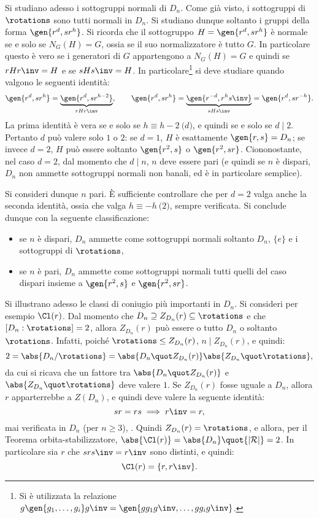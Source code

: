 \documentclass[12pt]{scrartcl}
\begin{document}
	
	
	Si studiano adesso i sottogruppi normali di $D_n$. Come già visto, i sottogruppi di
	$\rotations$ sono tutti normali in $D_n$. Si studiano dunque soltanto i gruppi
	della forma $\gen{r^d, s r^h}$. Si ricorda che il sottogruppo
	$H = \gen{r^d, s r^h}$ è normale se e solo se $N_G(H) = G$, ossia se il suo
	normalizzatore è tutto $G$. In particolare questo è vero se i generatori di $G$
	appartengono a $N_G(H) = G$ e quindi se $r H r\inv = H$ e se $s H s\inv = H$.
	In particolare\footnote{
		Si è utilizzata la relazione $g \gen{g_1, \ldots, g_i} g\inv = \gen{g g_1 g\inv, \ldots, g g_i g\inv}$.
	} si deve studiare quando valgono le seguenti identità:
	\[
		\gen{r^d, s r^h} = \underbrace{\gen{r^d, s r^{h-2}}}_{r H r\inv},
		\qquad \gen{r^d, s r^h} = \underbrace{\gen{r^{-d}, r^h s\inv}}_{s H s\inv} =
		\gen{r^d, s r^{-h}}.
	\]
	La prima identità è vera se e solo se $h \equiv h-2 \pod d$, e quindi se e solo
	se $d \mid 2$. Pertanto $d$ può valere solo $1$ o $2$: se $d = 1$, $H$ è
	esattamente $\gen{r, s} = D_n$; se invece $d = 2$, $H$ può essere soltanto
	$\gen{r^2, s}$ o $\gen{r^2, s r}$. Ciononostante, nel caso $d = 2$, dal momento
	che $d \mid n$, $n$ deve essere pari (e quindi se $n$ è dispari, $D_n$ non ammette
	sottogruppi normali non banali, ed è in particolare semplice). \medskip
	
	
	Si consideri dunque $n$ pari. È sufficiente controllare che per $d = 2$ valga
	anche la seconda identità, ossia che valga $h \equiv -h \pod 2$, sempre verificata.
	Si conclude dunque con la seguente classificazione:
	
	\begin{itemize}
		\item se $n$ è dispari, $D_n$ ammette come sottogruppi normali soltanto
		$D_n$, $\{ e \}$ e i sottogruppi di $\rotations$,
		\item se $n$ è pari, $D_n$ ammette come sottogruppi normali tutti quelli
			del caso dispari insieme a $\gen{r^2, s}$ e $\gen{r^2, s r}$.
	\end{itemize}
	
	
	Si illustrano adesso le classi di coniugio più importanti in $D_n$. Si consideri
	per esempio $\Cl(r)$. Dal momento che $D_n \supseteq Z_{D_n}(r) \subseteq \rotations$
	e che $[D_n : \rotations] = 2$, allora $Z_{D_n}(r)$ può essere o tutto $D_n$ o
	soltanto $\rotations$. Infatti, poiché $\rotations \leq Z_{D_n}(r)$,
	$n \mid Z_{D_n}(r)$, e quindi:
	\[ 2 = \abs{D_n/\rotations} = \abs{D_n \quot Z_{D_n}(r)} \abs{Z_{D_n} \quot \rotations}, \]
	da cui si ricava che un fattore tra $\abs{D_n \quot Z_{D_n}(r)}$ e
	$\abs{Z_{D_n} \quot \rotations}$ deve valere $1$. Se $Z_{D_n}(r)$ fosse uguale a
	$D_n$, allora $r$ apparterrebbe a $Z(D_n)$, e quindi deve valere la seguente identità:
	\[ sr = rs \implies r\inv = r, \]
	mai verificata in $D_n$ (per $n \geq 3$), \Lightning. Quindi $Z_{D_n}(r) = \rotations$,
	e allora, per il Teorema orbita-stabilizzatore, $\abs{\Cl(r)} = \abs{D_n} \quot {\left\lvert \mathcal{R} \right\rvert} = 2$. In particolare sia $r$ che $s r s\inv = r\inv$ sono distinti,
	e quindi:
	\[ \Cl(r) = \{r, r\inv\}. \] %
\end{document}
